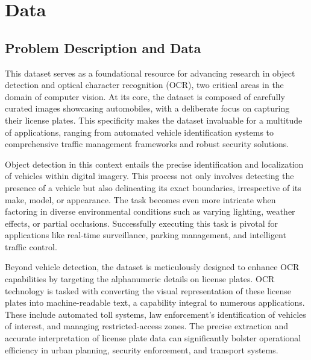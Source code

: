 %
%

\chapter{Data}

\section{Problem Description and Data}

This dataset serves as a foundational resource for advancing research in object detection and optical character recognition (OCR), two critical areas in the domain of computer vision. At its core, the dataset is composed of carefully curated images showcasing automobiles, with a deliberate focus on capturing their license plates. This specificity makes the dataset invaluable for a multitude of applications, ranging from automated vehicle identification systems to comprehensive traffic management frameworks and robust security solutions.

Object detection in this context entails the precise identification and localization of vehicles within digital imagery. This process not only involves detecting the presence of a vehicle but also delineating its exact boundaries, irrespective of its make, model, or appearance. The task becomes even more intricate when factoring in diverse environmental conditions such as varying lighting, weather effects, or partial occlusions. Successfully executing this task is pivotal for applications like real-time surveillance, parking management, and intelligent traffic control.

Beyond vehicle detection, the dataset is meticulously designed to enhance OCR capabilities by targeting the alphanumeric details on license plates. OCR technology is tasked with converting the visual representation of these license plates into machine-readable text, a capability integral to numerous applications. These include automated toll systems, law enforcement's identification of vehicles of interest, and managing restricted-access zones. The precise extraction and accurate interpretation of license plate data can significantly bolster operational efficiency in urban planning, security enforcement, and transport systems.

